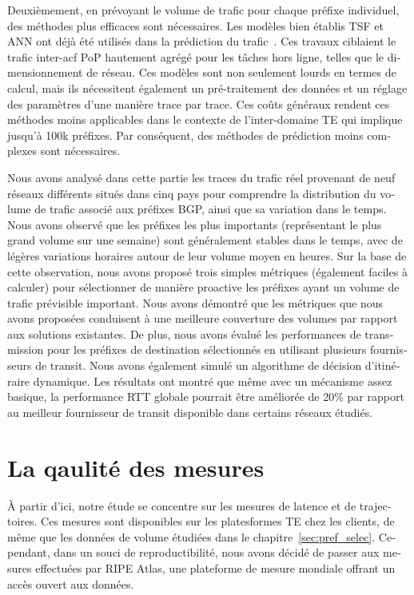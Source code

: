 \begin{otherlanguage}{french}
Deuxièmement, en prévoyant le volume de trafic pour chaque préfixe individuel, des méthodes plus efficaces sont nécessaires.
Les modèles bien établis \acf{TSF} et \acf{ANN} ont déjà été utilisés dans la prédiction du trafic~\cite{Papagiannaki2005, Cortez2006, Otoshi2013}.
Ces travaux ciblaient le trafic inter-acf {PoP} hautement agrégé pour les tâches hors ligne, telles que le dimensionnement de réseau.
Ces modèles sont non seulement lourds en termes de calcul, mais ils nécessitent également un pré-traitement des données et un réglage des paramètres d'une manière trace par trace. 
Ces coûts généraux rendent ces méthodes moins applicables dans le contexte de l'inter-domaine TE qui implique jusqu'à 100k préfixes. Par conséquent, des méthodes de prédiction moins complexes sont nécessaires.

Nous avons analysé dans cette partie les traces du trafic réel provenant de neuf réseaux différents situés dans cinq pays pour comprendre la distribution du volume de trafic associé aux préfixes BGP, ainsi que sa variation dans le temps.
Nous avons observé que les préfixes les plus importants (représentant le plus grand volume sur une semaine) sont généralement stables dans le temps, avec de légères variations horaires autour de leur volume moyen en heures.
Sur la base de cette observation, nous avons proposé trois simples
métriques (également faciles à calculer) pour sélectionner de manière proactive les préfixes ayant un volume de trafic prévisible important.
Nous avons démontré que les métriques que nous avons proposées conduisent à une meilleure couverture des volumes par rapport aux solutions existantes.
De plus, nous avons évalué les performances de transmission pour les préfixes de destination sélectionnés en utilisant plusieurs fournisseurs de transit.
Nous avons également simulé un algorithme de décision d'itinéraire dynamique.
Les résultats ont montré que même avec un mécanisme assez basique, la performance RTT globale pourrait être améliorée de 20\% par rapport au meilleur fournisseur de transit disponible dans certains réseaux étudiés.

\section*{La qaulité des mesures}

À partir d'ici, notre étude se concentre sur les mesures de latence et de trajectoires.
Ces mesures sont disponibles sur les platesformes TE chez les clients, de même que les données de volume étudiées dans le chapitre~\ref{sec:pref_selec}.
Cependant, dans un souci de reproductibilité, nous avons décidé de passer aux mesures effectuées par RIPE Atlas, une plateforme de mesure mondiale offrant un accès ouvert aux données. 


\end{otherlanguage}
